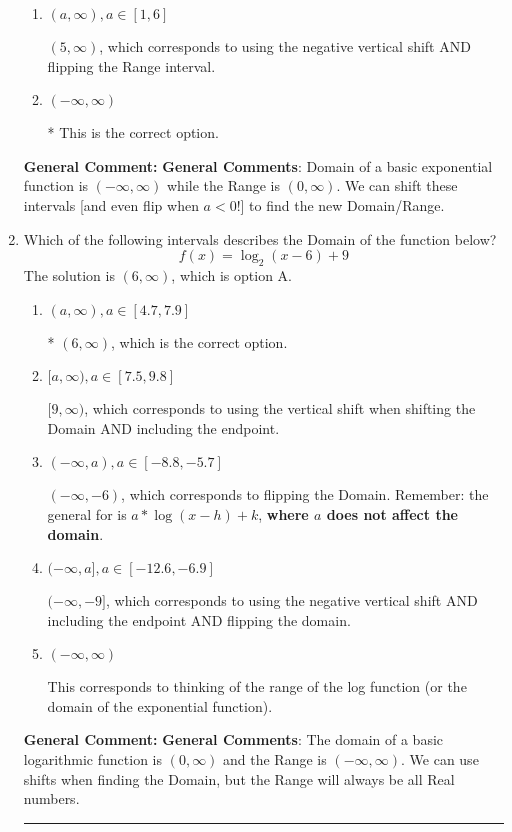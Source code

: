 \documentclass{extbook}[14pt]
\newcommand{\litem}[1]{\item #1

\rule{\textwidth}{0.4pt}}
\begin{document}
\begin{enumerate}
{\begin{enumerate}[label=\Alph*.]
$(-\infty, -5]$, which corresponds to using the correct vertical shift *if we wanted the Range* AND including the endpoint.
\item \( (a, \infty), a \in [1, 6] \)

$(5, \infty)$, which corresponds to using the negative vertical shift AND flipping the Range interval.
\item \( (-\infty, \infty) \)

* This is the correct option.
\end{enumerate}

\textbf{General Comment:} \textbf{General Comments}: Domain of a basic exponential function is $(-\infty, \infty)$ while the Range is $(0, \infty)$. We can shift these intervals [and even flip when $a<0$!] to find the new Domain/Range.
}
\litem{
Which of the following intervals describes the Domain of the function below?
\[ f(x) = \log_2{(x-6)}+9 \]The solution is \( (6, \infty) \), which is option A.\begin{enumerate}[label=\Alph*.]
\item \( (a, \infty), a \in [4.7, 7.9] \)

* $(6, \infty)$, which is the correct option.
\item \( [a, \infty), a \in [7.5, 9.8] \)

$[9, \infty)$, which corresponds to using the vertical shift when shifting the Domain AND including the endpoint.
\item \( (-\infty, a), a \in [-8.8, -5.7] \)

$(-\infty, -6)$, which corresponds to flipping the Domain. Remember: the general for is $a*\log(x-h)+k$, \textbf{where $a$ does not affect the domain}.
\item \( (-\infty, a], a \in [-12.6, -6.9] \)

$(-\infty, -9]$, which corresponds to using the negative vertical shift AND including the endpoint AND flipping the domain.
\item \( (-\infty, \infty) \)

This corresponds to thinking of the range of the log function (or the domain of the exponential function).
\end{enumerate}

\textbf{General Comment:} \textbf{General Comments}: The domain of a basic logarithmic function is $(0, \infty)$ and the Range is $(-\infty, \infty)$. We can use shifts when finding the Domain, but the Range will always be all Real numbers.
}
\end{enumerate}
\end{document}
